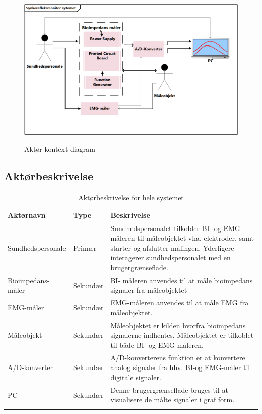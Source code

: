 \begin{figure}[H]
\centering
{\includegraphics[width=\textwidth]
{Figure/AktoerKontextDiagram}}
\caption{Aktør-kontext diagram}
\label{fig:sysbeskrivelse}
\end{figure}  

\subsection{Aktørbeskrivelse}
\begin{table}[H]
\begin{tabularx}{\textwidth}{l l X}
     Aktørnavn	&	Type		&	Beskrivelse \\ \midrule
     Sundhedspersonale   	&  	Primær  	& 	Sundhedspersonalet tilkobler BI- og EMG-måleren til måleobjektet vha. elektroder, samt starter og afslutter målingen. Yderligere interagerer sundhedspersonalet med en brugergrænseflade.     \\ 			  \addlinespace[2mm]
     Bioimpedans-måler	&	Sekundær	& BI- måleren anvendes til at måle bioimpedans signaler fra måleobjektet  	 \\   \addlinespace[2mm]

  EMG-måler	&	Sekundær	&	EMG-måleren anvendes til at måle EMG fra måleobjektet.
     \\   \addlinespace[2mm]
    
    Måleobjekt	&	Sekundær	&	Måleobjektet er kilden  hvorfra bioimpedans signalerne indhentes. Måleobjektet er tilkoblet til både BI- og EMG-måleren.
     \\   \addlinespace[2mm]
     
 A/D-konverter	&	Sekundær	&	A/D-konverterens funktion er at konvertere analog signaler fra hhv. BI-og EMG-måler  til digitale signaler.
     \\   \addlinespace[2mm]      
    PC	&	Sekundær	&	Denne brugergrænseflade bruges til at visualisere de målte signaler i graf form.
     \\   \addlinespace[2mm]
     
   
     \bottomrule                                                                                                                   
    \end{tabularx}
    \caption {Aktørbeskrivelse for hele systemet}
    \label{tab:aktoerbeskrivelse}
	
\end{table}

